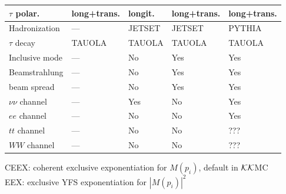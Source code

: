 \documentclass[dvips]{seminar}                      %
\newcommand{\KK}{${\cal KK}$}
\begin{document}
\begin{slide}
{\begin{center}
\begin{tabular}{|p{17mm}|l|l|l|l|}
    $\tau$ polar.     & {\tiny long+trans.}   
                      & longit.   & {\color{red} long+trans.}   &  { long+trans.}  \\
\hline%
\hline%
{\tiny Hadronization}   & ---   & JETSET   & JETSET               &  PYTHIA   \\
\hline%
    $\tau$ decay            & TAUOLA   & TAUOLA   & TAUOLA               &  TAUOLA   \\
\hline%
{\tiny Inclusive mode}  & ---   & No    & {\color{red} Yes}    &  Yes   \\
\hline%
{\tiny Beamstrahlung}   & ---   & No    & {\color{red} Yes} &  Yes   \\
\hline%
{\tiny beam spread}     & ---   & No    & Yes               &  Yes   \\
\hline%
\hline%
{\tiny $\nu\nu$ channel}& ---   & Yes   & {\color{red} No}  &  {\color{red} Yes}   \\
\hline%
{\tiny $ee$ channel}    & ---   & No    & {\color{red} No}  &  {\color{red} Yes}   \\
\hline%
{\tiny $tt$ channel}    & ---   & No    & No                &  ???   \\
\hline%
{\tiny $WW$ channel}    & ---   & No    & No                &  ???   \\
\hline\hline%
\end{tabular}
\end{center}
}
{\small
{\color{blue} CEEX}: coherent exclusive exponentiation for {\color{blue} $M(p_i)$}, default in \KK MC}\\
{\color{blue} EEX}: exclusive YFS exponentiation for {\color{blue} $|M(p_i)|^2$}



\end{slide}                               %
\end{document}
